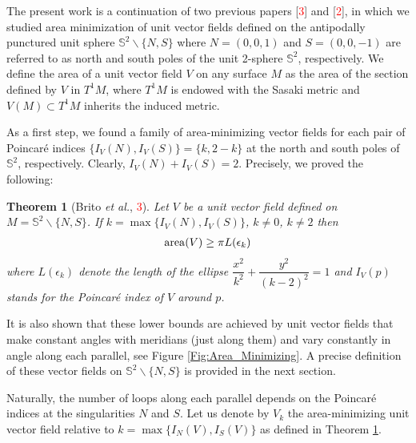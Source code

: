 \documentclass[reqno,11pt]{amsart}
\newtheorem{theorem}{Theorem}
\DeclareMathOperator{\area}{\rm area}
\begin{document}
The present work is a continuation of two previous papers [\textcolor{red}{3}] and [\textcolor{red}{2}], in which we studied area minimization of unit vector fields defined on the antipodally punctured unit sphere $\mathbb{S}^2\backslash\{N, S\}$ where $N=(0,0,1)$ and $S=(0,0,-1)$ are referred to as north and south poles of the unit 2-sphere $\mathbb{S}^2$, respectively. We define the area of a unit vector field $V$ on any surface $M$ as the area of the section defined by $V$ in $T^1M$, where $T^1M$ is endowed with the Sasaki metric and $V(M)\subset T^1M$ inherits the induced metric.

As a first step, we found a family of area-minimizing vector fields for each pair of Poincaré indices $\{I_V(N), I_V(S)\}=\{k, 2-k\}$ at the north and south poles of $\mathbb{S}^2$, respectively. Clearly, $I_V(N)+I_V(S)=2$. Precisely, we proved the following:

\begin{theorem}[Brito \textit{et al.}, \textcolor{red}{3}]\label{Thm:BCGN}
Let $V$ be a unit vector field defined on $M=\mathbb{S}^2\backslash\{N, S\}$. If $k = \max\{I_V(N), I_V(S)\}$, $k\neq0$, $k\neq2$ then 
\begin{eqnarray*}
    \area(V) \geq \pi L(\epsilon_k)
\end{eqnarray*} where $L(\epsilon_k)$ denote the length of the ellipse $\dfrac{x^2}{k^2}+\dfrac{y^2}{(k-2)^2}=1$ and $I_V(p)$ stands for the Poincaré index of $V$ around $p$.
   
\end{theorem}

    

It is also shown that these lower bounds are achieved by unit vector fields that make constant angles with meridians (just along them) and vary constantly in angle along each parallel, see Figure \ref{Fig:Area_Minimizing}. %
A precise definition of these vector fields on $\mathbb{S}^2 \backslash \{N, S\}$ is provided in the next section.

Naturally, the number of loops along each parallel depends on the Poincaré indices at the singularities $N$ and $S$. Let us denote by $V_k$ the area-minimizing unit vector field relative to $k=\max\{I_N(V), I_S(V)\}$ as defined in Theorem \ref{Thm:BCGN}.
\end{document}
